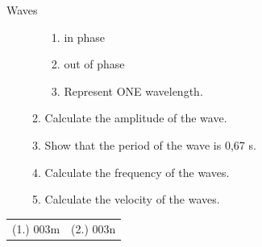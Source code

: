 \begin{eocexercises}{Waves}
\begin{enumerate}[noitemsep, label=\textbf{\arabic*}. ]
\begin{enumerate}[noitemsep, label=\textbf{\alph*}. ]
\label{m38806*uid0821323}\begin{enumerate}[noitemsep, label=\textbf{\roman*}. ] 
            \item in phase\item out of phase\item Represent ONE wavelength.\end{enumerate}
        \item Calculate the amplitude of the wave.\item Show that the period of the wave is 0,67 s.\item Calculate the frequency of the waves.\item Calculate the velocity of the waves.\end{enumerate}
         \end{enumerate}
  \label{m38806**end}
\par \practiceinfo
 \par \begin{tabular}[h]{cc}
(1.) 003m  &  (2.) 003n  & \end{tabular}

\end{eocexercises}
